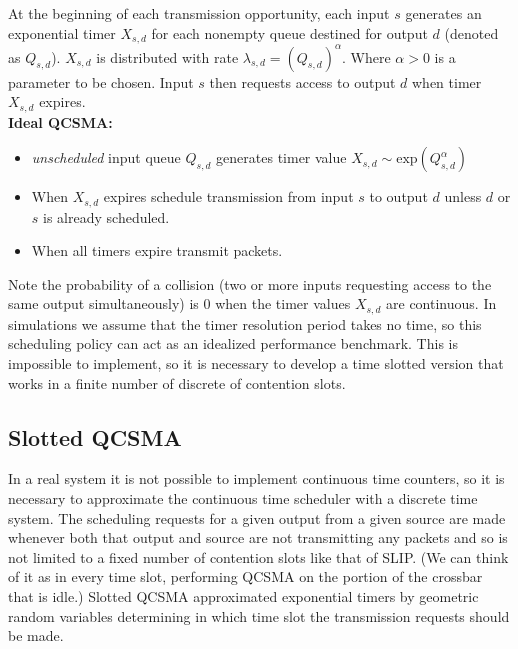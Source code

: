 \documentclass[11pt]{article}%
\begin{document}
At the beginning of each transmission opportunity, each input $s$ generates an exponential timer $X_{s,d}$ for each nonempty queue  destined for output $d$ (denoted as $Q_{s,d}$).  $X_{s,d}$ is distributed with rate $\lambda_{s,d} = (Q_{s,d})^{\alpha}$.  Where $\alpha > 0$ is a parameter to be chosen.  Input $s$ then requests access to output $d$ when timer $X_{s,d}$ expires. \\ %

{\bf Ideal QCSMA:}
\begin{itemize}
\item {\it unscheduled} input queue $Q_{s,d}$ generates timer value $X_{s,d}\sim \text{exp}(Q_{s,d}^\alpha)$
\item When $X_{s,d}$ expires schedule transmission from input $s$ to output $d$ unless $d$ or $s$ is already scheduled.
\item When all timers expire transmit packets.\\
\end{itemize}

Note the probability of a collision (two or more inputs requesting access to the same output simultaneously) is 0 when the timer values $X_{s,d}$ are continuous.  In simulations we assume that the timer resolution period takes no time, so this scheduling policy can act as an idealized performance benchmark.  This is impossible to implement, so it is necessary to develop a time slotted version that works in a finite number of discrete of contention slots.%

\subsection{Slotted QCSMA} \label{naive_qcsma}


In a real system it is not possible to implement continuous time counters, so it is necessary to approximate the continuous time scheduler with a discrete time system.  The scheduling requests for a given output from a given source are made whenever both that output and source are not transmitting any packets and so is not limited to a fixed number of contention slots like that of SLIP.  (We can think of it as in every time slot, performing QCSMA on the portion of the crossbar that is idle.)  Slotted QCSMA approximated exponential timers by geometric random variables determining in which time slot the transmission requests should be made.
\end{document}
